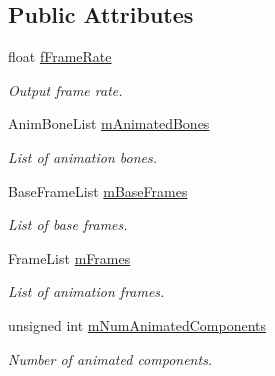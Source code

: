 \subsection*{Public Attributes}
\begin{DoxyCompactItemize}
\item 
\hypertarget{class_assimp_1_1_m_d5_1_1_m_d5_anim_parser_a596a6004b604bafde66e9604f2a27ca4}{float \hyperlink{class_assimp_1_1_m_d5_1_1_m_d5_anim_parser_a596a6004b604bafde66e9604f2a27ca4}{f\+Frame\+Rate}}\label{class_assimp_1_1_m_d5_1_1_m_d5_anim_parser_a596a6004b604bafde66e9604f2a27ca4}

\begin{DoxyCompactList}\small\item\em Output frame rate. \end{DoxyCompactList}\item 
\hypertarget{class_assimp_1_1_m_d5_1_1_m_d5_anim_parser_a900ebd3e8c7dbd886cf371390c2c17fe}{Anim\+Bone\+List \hyperlink{class_assimp_1_1_m_d5_1_1_m_d5_anim_parser_a900ebd3e8c7dbd886cf371390c2c17fe}{m\+Animated\+Bones}}\label{class_assimp_1_1_m_d5_1_1_m_d5_anim_parser_a900ebd3e8c7dbd886cf371390c2c17fe}

\begin{DoxyCompactList}\small\item\em List of animation bones. \end{DoxyCompactList}\item 
\hypertarget{class_assimp_1_1_m_d5_1_1_m_d5_anim_parser_a17c955b5464e05cf80743196834a6d30}{Base\+Frame\+List \hyperlink{class_assimp_1_1_m_d5_1_1_m_d5_anim_parser_a17c955b5464e05cf80743196834a6d30}{m\+Base\+Frames}}\label{class_assimp_1_1_m_d5_1_1_m_d5_anim_parser_a17c955b5464e05cf80743196834a6d30}

\begin{DoxyCompactList}\small\item\em List of base frames. \end{DoxyCompactList}\item 
\hypertarget{class_assimp_1_1_m_d5_1_1_m_d5_anim_parser_ae8266b8741f6d2222079b418f3eaf378}{Frame\+List \hyperlink{class_assimp_1_1_m_d5_1_1_m_d5_anim_parser_ae8266b8741f6d2222079b418f3eaf378}{m\+Frames}}\label{class_assimp_1_1_m_d5_1_1_m_d5_anim_parser_ae8266b8741f6d2222079b418f3eaf378}

\begin{DoxyCompactList}\small\item\em List of animation frames. \end{DoxyCompactList}\item 
\hypertarget{class_assimp_1_1_m_d5_1_1_m_d5_anim_parser_ae494c65dfc5b8a4965e7d22806f56af9}{unsigned int \hyperlink{class_assimp_1_1_m_d5_1_1_m_d5_anim_parser_ae494c65dfc5b8a4965e7d22806f56af9}{m\+Num\+Animated\+Components}}\label{class_assimp_1_1_m_d5_1_1_m_d5_anim_parser_ae494c65dfc5b8a4965e7d22806f56af9}

\begin{DoxyCompactList}\small\item\em Number of animated components. \end{DoxyCompactList}\end{DoxyCompactItemize}


